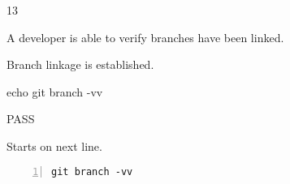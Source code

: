 \begin{description}[align=right,leftmargin=3.2cm,labelindent=3.0cm]
\item[Step:] 13
\item[Confirm:] A developer is able to verify branches have been linked.
\item[Expectation:] Branch linkage is established.
\item[Command:] echo git  branch -vv
\item[Test Result:] PASS
\item[Evidence:] Starts on next line.
\end{description}
\begin{lstlisting}[numbers=left]
git branch -vv

\end{lstlisting}

